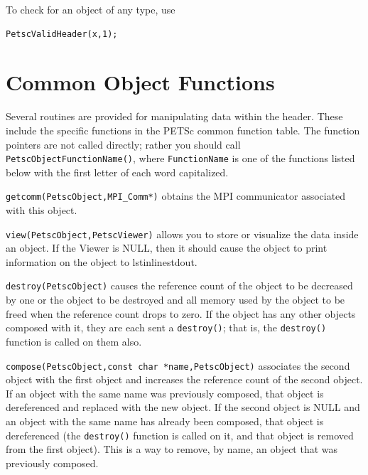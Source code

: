 To check for an object of any type, use
\begin{lstlisting}
PetscValidHeader(x,1);
\end{lstlisting}

\section{Common Object Functions}

Several routines are provided for manipulating data within the header.
These include the specific functions in the PETSc common function
table. The function pointers are not called directly; rather you should call
\lstinline{PetscObjectFunctionName()}, where \lstinline{FunctionName} is
one of the functions listed below with the first letter of each word
capitalized.

\begin{tightitemize}
\item \lstinline{getcomm(PetscObject,MPI_Comm*)} obtains the MPI communicator associated
      with this object.

\item \lstinline{view(PetscObject,PetscViewer)} allows you to store or visualize the data inside
      an object. If the Viewer is NULL, then it should cause the object to print
      information on the object to lstinline{stdout}.

\item \lstinline{destroy(PetscObject)} causes the reference count of the object to be decreased
      by one or the object to be destroyed and all memory used by the object to be freed when
      the reference count drops to zero.
      If the object has any other objects composed with it, they are each sent a
      \lstinline{destroy()}; that is, the \lstinline{destroy()} function is called on them also.

\item \lstinline{compose(PetscObject,const char *name,PetscObject)} associates the second object with
      the first object and increases the reference count of the second object. If an
      object with the
      same name was previously composed, that object is dereferenced and replaced with
      the new object. If the
      second object is NULL and an object with the same name has already been
      composed, that object is dereferenced (the \lstinline{destroy()} function is called on
      it, and that object is removed from the first object). This is a way to
      remove, by name, an object that was previously composed.


\end{tightitemize}

